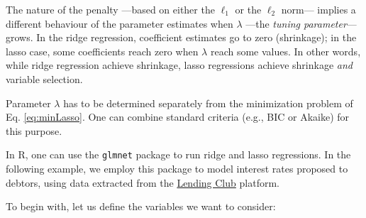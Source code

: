 \documentclass[
  12pt,
]{book}
\theoremstyle{definition}
\theoremstyle{definition}
\theoremstyle{definition}
\theoremstyle{definition}
\theoremstyle{remark}
\begin{document}
The nature of the penalty ---based on either the \(\ell_1\) or the \(\ell_2\) norm--- implies a different behaviour of the parameter estimates when \(\lambda\) ---the \emph{tuning parameter}--- grows. In the ridge regression, coefficient estimates go to zero (shrinkage); in the lasso case, some coefficients reach zero when \(\lambda\) reach some values. In other words, while ridge regression achieve shrinkage, lasso regressions achieve shrinkage \emph{and} variable selection.

Parameter \(\lambda\) has to be determined separately from the minimization problem of Eq. \eqref{eq:minLasso}. One can combine standard criteria (e.g., BIC or Akaike) for this purpose.

In R, one can use the \texttt{glmnet} package to run ridge and lasso regressions. In the following example, we employ this package to model interest rates proposed to debtors, using data extracted from the \href{https://www.kaggle.com/datasets/ethon0426/lending-club-20072020q1}{Lending Club} platform.

To begin with, let us define the variables we want to consider:
\end{document}
